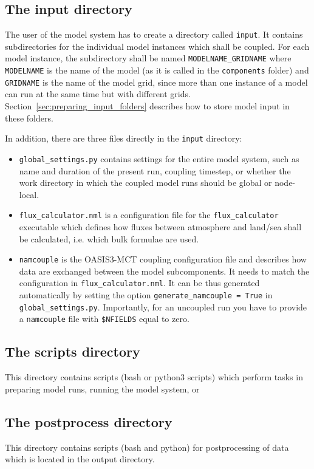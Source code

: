 \documentclass[a4paper,titlepage]{scrartcl}
\begin{document}
\subsection{The input directory}
The user of the model system has to create a directory called \texttt{input}.
It contains subdirectories for the individual model instances which shall be coupled.
For each model instance, the subdirectory shall be named \texttt{\color{red}MODELNAME\color{black}\_\color{red}GRIDNAME} where \texttt{\color{red}MODELNAME} is the name of the model (as it is called in the \texttt{components} folder) and \texttt{\color{red}GRIDNAME} is the name of the model grid, since more than one instance of a model can run at the same time but with different grids.
Section~\ref{sec:preparing_input_folders} describes how to store model input in these folders.

In addition, there are three files directly in the \texttt{input} directory:
\begin{itemize}
\item \texttt{global\_settings.py} contains settings for the entire model system, such as name and duration of the present run, coupling timestep, or whether the work directory in which the coupled model runs should be global or node-local.
\item \texttt{flux\_calculator.nml} is a configuration file for the \texttt{flux\_calculator} executable which defines how fluxes between atmosphere and land/sea shall be calculated, i.e. which bulk formulae are used.
\item \texttt{namcouple} is the OASIS3-MCT coupling configuration file and describes how data are exchanged between the model subcomponents. It needs to match the configuration in \texttt{flux\_calculator.nml}. It can be thus generated automatically by setting the option \texttt{generate\_namcouple = True} in \texttt{global\_settings.py}. Importantly, for an uncoupled run you have to provide a \texttt{namcouple} file with \texttt{\$NFIELDS} equal to zero. 
\end{itemize}

\subsection{The scripts directory}
This directory contains scripts (bash or python3 scripts) which perform tasks in preparing model runs, running the model system, or 

\subsection{The postprocess directory}
This directory contains scripts (bash and python) for postprocessing of data which is located in the output directory.
\end{document}
